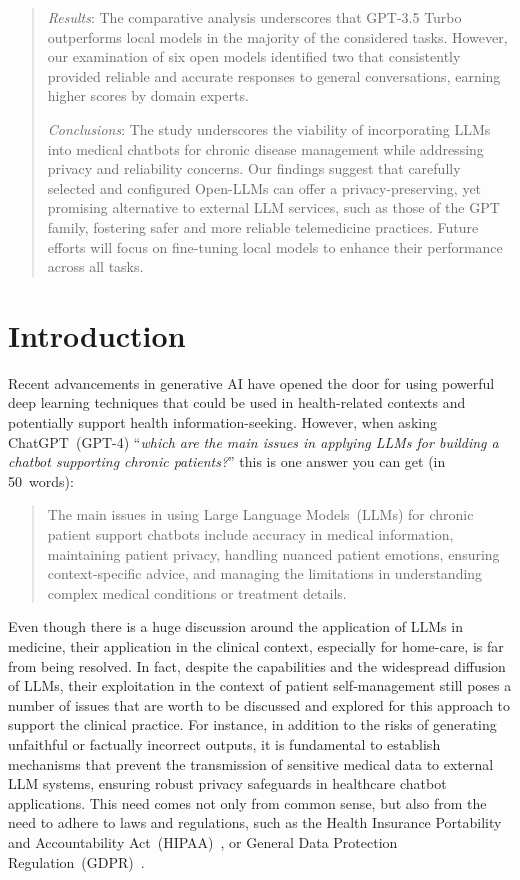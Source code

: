 \begin{abstract}
\emph{Results}: 
The comparative analysis underscores that GPT-3.5 Turbo outperforms local models in the majority of the considered tasks. 
%
However, our examination of six open models identified two that consistently provided reliable and accurate responses to general conversations,  earning higher scores by domain experts.


\emph{Conclusions}: The study underscores the viability of incorporating LLMs into medical chatbots for chronic disease management while addressing privacy and reliability concerns.
%
Our findings suggest that carefully selected and configured Open-LLMs can offer a privacy-preserving, yet promising alternative to external LLM services, such as those of the GPT family, fostering safer and more reliable telemedicine practices.
%
Future efforts will focus on fine-tuning local models to enhance their performance across all tasks.



\end{abstract}
\section{Introduction}

Recent advancements in generative AI have opened the door for using powerful deep learning techniques that could be used in health-related contexts and potentially support health information-seeking.
%
However, when asking ChatGPT~(GPT-4) ``\emph{which are the main issues in applying LLMs for building a chatbot supporting chronic patients?}'' this is one answer you can get (in 50~words):
%
\begin{quote}
The main issues in using Large Language Models~(LLMs) for chronic patient support chatbots include accuracy in medical information, maintaining patient privacy, handling nuanced patient emotions, ensuring context-specific advice, and managing the limitations in understanding complex medical conditions or treatment details.
\end{quote}
%
Even though there is a huge discussion around the application of LLMs in medicine, their application in the clinical context, especially for home-care, is far from being resolved.
%
In fact, despite the capabilities and the widespread diffusion of LLMs, their exploitation in the context of patient self-management still poses a number of issues that are worth to be discussed and explored for this approach to support the clinical practice.
%
For instance, in addition to the risks of generating unfaithful or factually incorrect outputs, it is fundamental to establish mechanisms that prevent the transmission of sensitive medical data to external LLM systems, ensuring robust privacy safeguards in healthcare chatbot applications. 
%
This need comes not only from common sense, but also from the need to adhere to laws and regulations, such as the Health Insurance Portability and Accountability Act~(HIPAA)~\cite{hipaa}, or General Data Protection Regulation~(GDPR)~\cite{gdpr,Zichichi20224515}.

